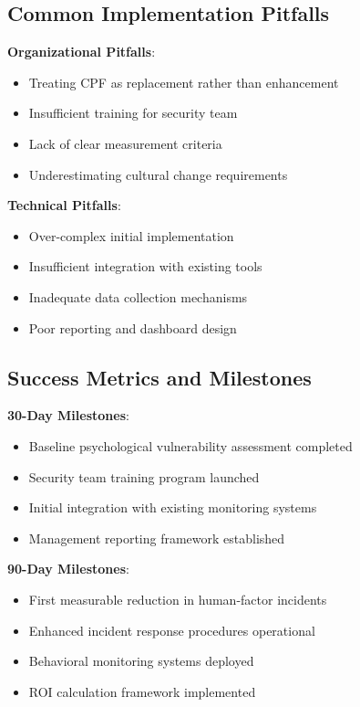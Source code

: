 \documentclass[11pt,a4paper]{article}
\begin{document}
\subsection{Common Implementation Pitfalls}

\textbf{Organizational Pitfalls}:
\begin{itemize}
\item Treating CPF as replacement rather than enhancement
\item Insufficient training for security team
\item Lack of clear measurement criteria
\item Underestimating cultural change requirements
\end{itemize}

\textbf{Technical Pitfalls}:
\begin{itemize}
\item Over-complex initial implementation
\item Insufficient integration with existing tools
\item Inadequate data collection mechanisms
\item Poor reporting and dashboard design
\end{itemize}

\subsection{Success Metrics and Milestones}

\textbf{30-Day Milestones}:
\begin{itemize}
\item Baseline psychological vulnerability assessment completed
\item Security team training program launched
\item Initial integration with existing monitoring systems
\item Management reporting framework established
\end{itemize}

\textbf{90-Day Milestones}:
\begin{itemize}
\item First measurable reduction in human-factor incidents
\item Enhanced incident response procedures operational
\item Behavioral monitoring systems deployed
\item ROI calculation framework implemented
\end{itemize}
\end{document}
